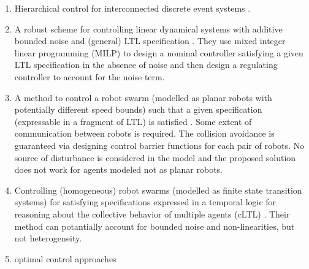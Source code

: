 \begin{enumerate}
	\item Hierarchical control for interconnected discrete event systems \cite{wong1996hierarchical,schmidt2008nonblocking}.
	\item A robust scheme for controlling linear dynamical systems with additive bounded noise and (general) LTL specification \cite{Yang2017milp}. They use mixed integer linear programming (MILP) to design a nominal controller satisfying a given LTL specification in the absence of noise and then design a regulating controller to account for the noise term.
	\item A method to control a robot swarm (modelled as planar robots with potentially different speed bounds) such that a given specification (expressable in a fragment of LTL) is satisfied \cite{Chen2018cbf}. Some extent of communication between robots is required. The collision avoidance is guaranteed via designing control barrier functions for each pair of robots. No source of disturbance is considered in the model and the proposed solution does not work for agents modeled not as planar robots.
	\item Controlling (homogeneous) robot swarms (modelled as finite state transition systems) for satisfying specifications expressed in a temporal logic for reasoning about the collective behavior of multiple agents (cLTL) \cite{Shahin2017cltl}. Their method can potantially account for bounded noise and non-linearities, but not heterogeneity.
	\item optimal control approaches 
\end{enumerate}